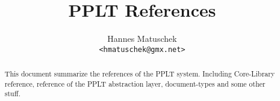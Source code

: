 \documentclass{manual}
\title{PPLT References}
\author{Hannes Matuschek\\\texttt{<hmatuschek@gmx.net>}}
\begin{document}
   
    \maketitle
    \begin{abstract}
    This document summarize the references of the PPLT system. Including Core-Library reference, reference
    of the PPLT abstraction layer, document-types and some other stuff.
    \end{abstract}

    \tableofcontents


    
    
    
    
    
    
    
    
    
    
 
\end{document}
